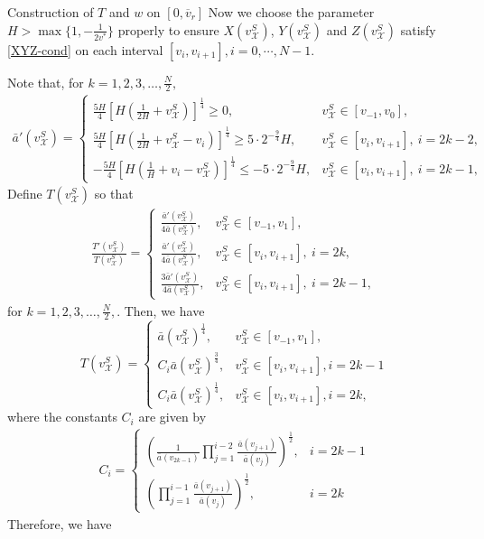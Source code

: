 \documentclass[12pt,reqno]{amsart}
\numberwithin{equation}{section}
\def\vsx{v^S_{\mathcal{X}}}
\def\avr{\overline{v}_r}
\begin{document}
\begin{part}{Construction of $T$ and $w$ on $[0,\avr]$}
Now we choose the parameter $H>\max\{1,-\frac{1}{2v^\ast}\}$ properly to ensure $X(\vsx)$, $Y(\vsx)$ and $Z(\vsx)$ satisfy \eqref{XYZ-cond} on each interval $[v_i,v_{i+1}], i=0,\cdots, N-1$. 

Note that, for $k=1,2,3,\dots,\frac{N}{2},$
	\begin{align*}
	\bar{a}'(\vsx)=
	\begin{cases}
		\frac{5H}{4}[H(\frac{1}{2H}+\vsx)]^{\frac{1}{4}}\geq 0,&\vsx \in [v_{-1},v_{0}],\\
		\frac{5H}{4}[H(\frac{1}{2H}+\vsx-v_{i})]^{\frac{1}{4}}\geq5\cdot 2^{-\frac{9}{4}}H,&\vsx \in [v_{i},v_{i+1}], ~i=2k-2,\\
		-\frac{5H}{4}[H(\frac{1}{H}+v_{i}-\vsx)]^{\frac{1}{4}}\leq-5\cdot 2^{-\frac{9}{4}}H,&\vsx \in [v_{i},v_{i+1}],~ i=2k-1,
	\end{cases}
\end{align*}
Define $T(\vsx)$ so that
	\begin{align*}
	\frac{T'(\vsx)}{T(\vsx)}=
	\begin{cases}
		\frac{\bar{a}'(\vsx)}{4\bar{a}(\vsx)},&\vsx \in [v_{-1},v_1],\\
		\frac{\bar{a}'(\vsx)}{4\bar{a}(\vsx)},&\vsx \in [v_{i},v_{i+1}], ~i=2k,\\
		\frac{3\bar{a}'(\vsx)}{4\bar{a}(\vsx)},&\vsx \in [v_{i},v_{i+1}], ~i=2k-1,
	\end{cases}
\end{align*}
for $k=1,2,3,\dots,\frac{N}{2},$. Then,  we have
	\begin{equation}\label{tv}
	T(\vsx)=
	\begin{cases}
		\bar{a}(\vsx)^{\frac{1}{4}},&\vsx \in [v_{-1},v_1],\\
		C_{i} \bar{a}(\vsx)^{\frac{3}{4}}, &\vsx \in [v_{i},v_{i+1}], i=2k-1\\
		C_{i} \bar{a}(\vsx)^{\frac{1}{4}}, &\vsx \in [v_{i},v_{i+1}],i=2k,
	\end{cases}
\end{equation}
where the constants $C_i$ are given by
\begin{align*}
C_{i}=\begin{cases}
	\left(\frac{1}{\bar{a}(v_{2k-1})}\prod_{j=1}^{i-2}\frac{\bar{a}(v_{j+1})}{\bar{a}(v_j)}\right)^{\frac{1}{2}},&i=2k-1\\
	\left(\prod_{j=1}^{i-1}\frac{\bar{a}(v_{j+1})}{\bar{a}(v_j)}\right)^{\frac{1}{2}},&i=2k
\end{cases}
\end{align*}
 Therefore, we have
\begin{align*}

\end{align*}
\end{part}
\end{document}
